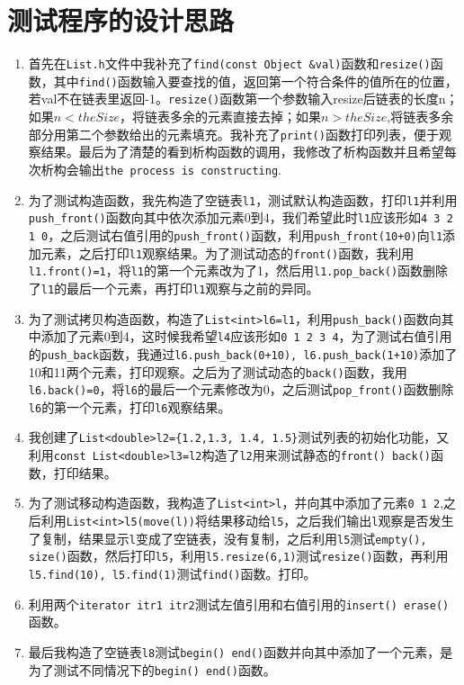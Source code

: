 \documentclass[UTF8]{ctexart}
\begin{document}
\pagestyle{fancy}
\fancyhead{}
\rhead{\today}

\section{测试程序的设计思路}
\begin{enumerate}
	\item 首先在\lstinline|List.h|文件中我补充了\lstinline|find(const Object &val)|函数和\lstinline|resize()|函数，其中\lstinline|find()|函数输入要查找的值，返回第一个符合条件的值所在的位置，若val不在链表里返回-1。\lstinline|resize()|函数第一个参数输入resize后链表的长度n；如果$n<theSize$，将链表多余的元素直接去掉；如果$n>theSize$,将链表多余部分用第二个参数给出的元素填充。我补充了\lstinline|print()|函数打印列表，便于观察结果。最后为了清楚的看到析构函数的调用，我修改了析构函数并且希望每次析构会输出\lstinline|the process is constructing|.
	\item 为了测试构造函数，我先构造了空链表\lstinline|l1|，测试默认构造函数，打印\lstinline|l1|并利用\lstinline|push_front()|函数向其中依次添加元素0到4，我们希望此时\lstinline|l1|应该形如\lstinline|4 3 2 1 0|，之后测试右值引用的\lstinline|push_front()|函数，利用\lstinline|push_front(10+0)|向\lstinline|l1|添加元素，之后打印\lstinline|l1|观察结果。为了测试动态的\lstinline|front()|函数，我利用\lstinline|l1.front()=1|，将\lstinline|l1|的第一个元素改为了1，然后用\lstinline|l1.pop_back()|函数删除了\lstinline|l1|的最后一个元素，再打印\lstinline|l1|观察与之前的异同。
	\item 为了测试拷贝构造函数，构造了\lstinline|List<int>l6=l1|，利用\lstinline|push_back()|函数向其中添加了元素0到4，这时候我希望\lstinline|l4|应该形如\lstinline|0 1 2 3 4|，为了测试右值引用的\lstinline|push_back|函数，我通过\lstinline|l6.push_back(0+10), l6.push_back(1+10)|添加了10和11两个元素，打印观察。之后为了测试动态的\lstinline|back()|函数，我用\lstinline|l6.back()=0|，将\lstinline|l6|的最后一个元素修改为0，之后测试\lstinline|pop_front()|函数删除\lstinline|l6|的第一个元素，打印\lstinline|l6|观察结果。
	\item  我创建了\lstinline|List<double>l2={1.2,1.3, 1.4, 1.5}|测试列表的初始化功能，又利用\lstinline|const List<double>l3=l2|构造了\lstinline|l2|用来测试静态的\lstinline|front() back()|函数，打印结果。
	\item  为了测试移动构造函数，我构造了\lstinline|List<int>l|，并向其中添加了元素\lstinline|0 1 2|,之后利用\lstinline|List<int>l5(move(l))|将结果移动给\lstinline|l5|，之后我们输出\lstinline|l|观察是否发生了复制，结果显示\lstinline|l|变成了空链表，没有复制，之后利用\lstinline|l5|测试\lstinline|empty(), size()|函数，然后打印\lstinline|l5|，利用\lstinline|l5.resize(6,1)|测试\lstinline|resize()|函数，再利用\lstinline|l5.find(10), l5.find(1)|测试\lstinline|find()|函数。打印。
	\item 利用两个\lstinline|iterator itr1 itr2|测试左值引用和右值引用的\lstinline|insert() erase()|函数。
	\item 最后我构造了空链表\lstinline|l8|测试\lstinline|begin() end()|函数并向其中添加了一个元素，是为了测试不同情况下的\lstinline|begin() end()|函数。
\end{enumerate}
\end{document}
